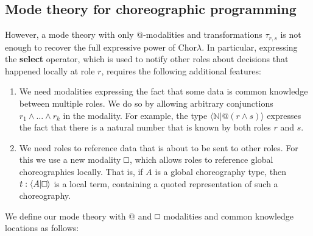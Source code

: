 \documentclass{scrartcl}
\theoremstyle{definition}
\theoremstyle{plain}
\renewcommand{\square}%
  {\tikz{\draw (0,0) rectangle (0.2cm,0.2cm);}}
\begin{document}
\subsection{Mode theory for choreographic programming}
However, a mode theory with only $@$-modalities and transformations
$\tau_{r,s}$ is not enough to recover the full expressive power of
Chor$\lambda$. In particular, expressing the \textbf{select} operator, which is
used to notify other roles about decisions that happened locally at role $r$,
requires the following additional features:
\begin{enumerate}
\item
  We need modalities expressing the fact that some data is common knowledge
  between multiple roles. We do so by allowing arbitrary conjunctions $r_1
  \land \ldots \land r_k$ in the modality. For example, the type $\langle
  \mathbb{N} | @(r\land s) \rangle$ expresses the fact that there is a natural
  number that is known by both roles $r$ and $s$.
\item
  We need roles to reference data that is about to be sent to other roles. For
  this we use a new modality $\square$, which allows roles to reference global
  choreographies locally. That is, if $A$ is a global choreography type, then
  $t : \langle A | \square \rangle$ is a local term, containing a quoted
  representation of such a choreography.
\end{enumerate}
We define our mode theory with $@$ and $\square$ modalities and common
knowledge locations as follows:
\end{document}
